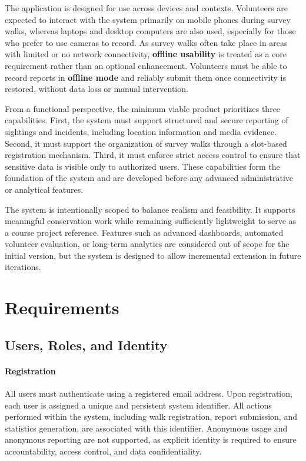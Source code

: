 \documentclass[11pt]{article}
\begin{document}
The application is designed for use across devices and contexts. Volunteers are expected to interact with the system primarily on mobile phones during survey walks, whereas laptops and desktop computers are also used, especially for those who prefer to use cameras to record. As survey walks often take place in areas with limited or no network connectivity, \textbf{offline usability} is treated as a core requirement rather than an optional enhancement. Volunteers must be able to record reports in \textbf{offline mode} and reliably submit them once connectivity is restored, without data loss or manual intervention.

From a functional perspective, the minimum viable product prioritizes three capabilities. First, the system must support structured and secure reporting of sightings and incidents, including location information and media evidence. Second, it must support the organization of survey walks through a slot-based registration mechanism. Third, it must enforce strict access control to ensure that sensitive data is visible only to authorized users. These capabilities form the foundation of the system and are developed before any advanced administrative or analytical features.

The system is intentionally scoped to balance realism and feasibility. It supports meaningful conservation work while remaining sufficiently lightweight to serve as a course project reference. Features such as advanced dashboards, automated volunteer evaluation, or long-term analytics are considered out of scope for the initial version, but the system is designed to allow incremental extension in future iterations.


\section{Requirements}

\subsection{Users, Roles, and Identity}

\paragraph{Registration}
All users must authenticate using a registered email address. Upon registration, each user is assigned a unique and persistent system identifier. All actions performed within the system, including walk registration, report submission, and statistics generation, are associated with this identifier. Anonymous usage and anonymous reporting are not supported, as explicit identity is required to ensure accountability, access control, and data confidentiality.
\end{document}
